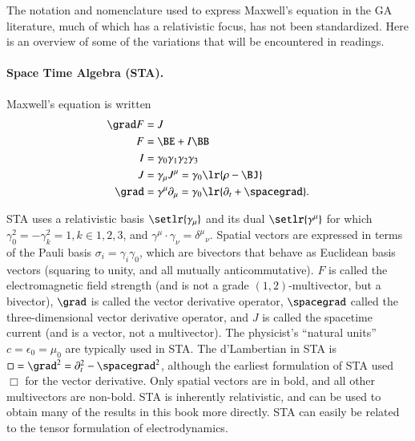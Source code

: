 %
%
The notation and nomenclature used to express Maxwell's equation in the GA literature, much of which has a relativistic focus, has not been standardized.
Here is an overview of some of the variations that will be encountered in readings.

\paragraph{Space Time Algebra (STA).  \citep{doran2003gap}}

Maxwell's equation is written
\begin{dmath}\label{eqn:galiterature:80}
\begin{aligned}
\grad F &= J \\
F &= \BE + I \BB \\
I &= \gamma_0 \gamma_1 \gamma_2 \gamma_3 \\
J &= \gamma_\mu J^\mu = \gamma_0 \lr{ \rho - \BJ } \\
\grad &= \gamma^\mu \partial_\mu = \gamma_0 \lr{ \partial_t + \spacegrad }.
\end{aligned}
\end{dmath}

STA uses a relativistic basis \( \setlr{ \gamma_\mu } \) and its dual \( \setlr{ \gamma^\mu} \) for which \( \gamma_0^2 = -\gamma_k^2 = 1, k \in 1,2,3 \), and \( \gamma^\mu \cdot \gamma_\nu = {\delta^\mu}_\nu \).
Spatial vectors are expressed in terms of the Pauli basis \( \sigma_i = \gamma_i \gamma_0 \), which are bivectors that behave as Euclidean basis vectors (squaring to unity, and all mutually anticommutative).
\( F \) is called the electromagnetic field strength (and is not a grade \((1,2)\)-multivector, but a bivector), \( \grad \) is called the vector derivative operator, \( \spacegrad \) called the three-dimensional vector derivative operator, and \( J \) is called the spacetime current (and is a vector, not a multivector).
The physicist's ``natural units'' \( c = \epsilon_0 = \mu_0 \) are typically used in STA.
The d'Lambertian in STA is \( \Box = \grad^2 = \partial_t^2 - \spacegrad^2 \), although the earliest
formulation of STA \citep{hestenes1966space} used \( \Box \) for the vector derivative.
Only spatial vectors are in bold, and all other multivectors are non-bold.
STA is inherently relativistic, and can be used to obtain many of the results in this book more directly.
STA can easily be related to the tensor formulation of electrodynamics.

